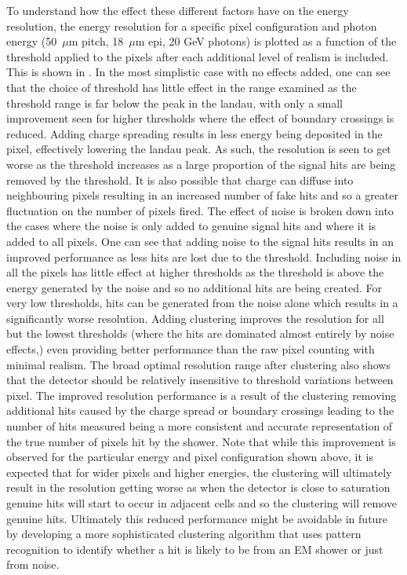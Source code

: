 To understand how the effect these different factors have on the energy resolution, the energy resolution for a specific pixel configuration and photon energy (50~$\mu$m pitch, 18~$\mu$m epi, 20 GeV photons) is plotted as a function of the threshold applied to the pixels after each additional level of realism is included. This is shown in . In the most simplistic case with no effects added, one can see that the choice of threshold has little effect in the range examined as the threshold range is far below the peak in the landau, with only a small improvement seen for higher thresholds where the effect of boundary crossings is reduced. Adding charge spreading results in less energy being deposited in the pixel, effectively lowering the landau peak. As such, the resolution is seen to get worse as the threshold increases as a large proportion of the signal hits are being removed by the threshold. It is also possible that charge can diffuse into neighbouring pixels resulting in an increased number of fake hits and so a greater fluctuation on the number of pixels fired. The effect of noise is broken down into the cases where the noise is only added to genuine signal hits and where it is added to all pixels. One can see that adding noise to the signal hits results in an improved performance as less hits are lost due to the threshold. Including noise in all the pixels has little effect at higher thresholds as the threshold is above the energy generated by the noise and so no additional hits are being created. For very low thresholds, hits can be generated from the noise alone which results in a significantly worse resolution. Adding clustering improves the resolution for all but the lowest thresholds (where the hits are dominated almost entirely by noise effects,) even providing better performance than the raw pixel counting with minimal realism. The broad optimal resolution range after clustering also shows that the detector should be relatively insensitive to threshold variations between pixel. The improved resolution performance is a result of the clustering removing additional hits caused by the charge spread or boundary crossings leading to the number of hits measured being a more consistent and accurate representation of the true number of pixels hit by the shower. Note that while this improvement is observed for the particular energy and pixel configuration shown above, it is expected that for wider pixels and higher energies, the clustering will ultimately result in the resolution getting worse as when the detector is close to saturation genuine hits will start to occur in adjacent cells and so the clustering will remove genuine hits. Ultimately this reduced performance might be avoidable in future by developing a more sophisticated clustering algorithm that uses pattern recognition to identify whether a hit is likely to be from an EM shower or just from noise.


